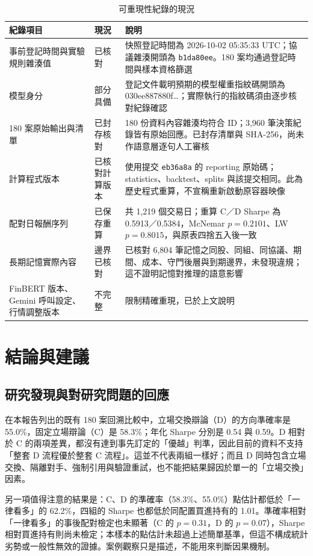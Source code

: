\documentclass[12pt,a4paper]{article}
\numberwithin{table}{section}
\numberwithin{figure}{section}
\begin{document}
\begin{table}[H]
\centering\small
\caption{可重現性紀錄的現況}
\label{tab:prov}
\begin{tabularx}{\textwidth}{@{}L{.25} L{.15} Y@{}}
\toprule
紀錄項目 & 現況 & 說明 \\
\midrule
事前登記時間與實驗規則雜湊值 & 已核對 & 快照登記時間為 2026-10-02 05:35:33 UTC；協議雜湊開頭為 \texttt{b1da80ee}。180 案均通過登記時間與樣本資格篩選 \\
模型身分 & 部分具備 & 登記文件載明預期的模型權重指紋碼開頭為 030ee887880f…；實際執行的指紋碼須由逐步核對紀錄確認 \\
180 案原始輸出與清單 & 已封存核對 & 180 份資料內容雜湊均符合 ID；3,960 筆決策紀錄皆有原始回應。已封存清單與 SHA-256，尚未作語意層逐句人工審核 \\
計算程式版本 & 已核對計算版本 & 使用提交 \texttt{eb36a8a} 的 reporting 原始碼；statistics、backtest、splits 與該提交相同。此為歷史程式重算，不宣稱重新啟動原容器映像 \\
配對日報酬序列 & 已保存重算 & 共 1,219 個交易日；重算 C／D Sharpe 為 0.5913／0.5384，McNemar $p=0.2101$、LW $p=0.8015$，與原表四捨五入後一致 \\
長期記憶實際內容 & 邊界已核對 & 已核對 6,804 筆記憶之同股、同組、同協議、期間、成本、守門後層與到期邊界，未發現違規；這不證明記憶對推理的語意影響 \\
FinBERT 版本、Gemini 呼叫設定、行情調整版本 & 不完整 & 限制精確重現，已於上文說明 \\
\bottomrule
\end{tabularx}
\end{table}


\clearpage\section{結論與建議}

\subsection{研究發現與對研究問題的回應}

在本報告列出的既有 180 案回溯比較中，立場交換辯論（D）的方向準確率是 55.0\%，固定立場辯論（C）是 58.3\%；年化 Sharpe 分別是 0.54 與 0.59。D 相對於 C 的兩項差異，都沒有達到事先訂定的「優越」判準，因此目前的資料不支持「整套 D 流程優於整套 C 流程」。這並不代表兩組一樣好；而且 D 同時包含立場交換、隔離對手、強制引用與驗證重試，也不能把結果歸因於單一的「立場交換」因素。

另一項值得注意的結果是：C、D 的準確率（58.3\%、55.0\%）點估計都低於「一律看多」的 62.2\%，四組的 Sharpe 也都低於同配置買進持有的 1.01。準確率相對「一律看多」的事後配對檢定也未顯著（C 的 $p=0.31$，D 的 $p=0.07$），Sharpe 相對買進持有則尚未檢定；本樣本的點估計未超過上述簡單基準，但這不構成統計劣勢或一般性無效的證據。案例觀察只是描述，不能用來判斷因果機制。
\end{document}
